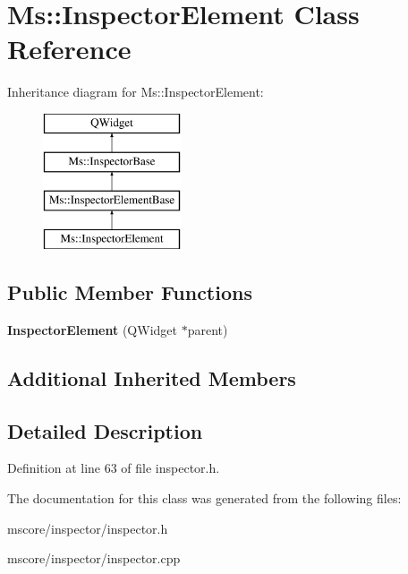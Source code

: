 \hypertarget{class_ms_1_1_inspector_element}{}\section{Ms\+:\+:Inspector\+Element Class Reference}
\label{class_ms_1_1_inspector_element}
Inheritance diagram for Ms\+:\+:Inspector\+Element\+:\begin{figure}[H]
\begin{center}
\leavevmode
\includegraphics[height=4.000000cm]{class_ms_1_1_inspector_element}
\end{center}
\end{figure}
\subsection*{Public Member Functions}
\begin{DoxyCompactItemize}
\item 
\mbox{\label{class_ms_1_1_inspector_element_a7216043aeccebc37f9726f7153aad317}} 
{\bfseries Inspector\+Element} (Q\+Widget $\ast$parent)
\end{DoxyCompactItemize}
\subsection*{Additional Inherited Members}


\subsection{Detailed Description}


Definition at line 63 of file inspector.\+h.



The documentation for this class was generated from the following files\+:\begin{DoxyCompactItemize}
\item 
mscore/inspector/inspector.\+h\item 
mscore/inspector/inspector.\+cpp\end{DoxyCompactItemize}
